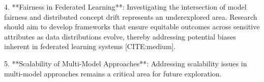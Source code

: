 \documentclass[journal]{IEEEtran}
\begin{document}
4. **Fairness in Federated Learning**: Investigating the intersection of model fairness and distributed concept drift represents an underexplored area. Research should aim to develop frameworks that ensure equitable outcomes across sensitive attributes as data distributions evolve, thereby addressing potential biases inherent in federated learning systems [CITE:medium].

5. **Scalability of Multi-Model Approaches**: Addressing scalability issues in multi-model approaches remains a critical area for future exploration.



\end{document}
